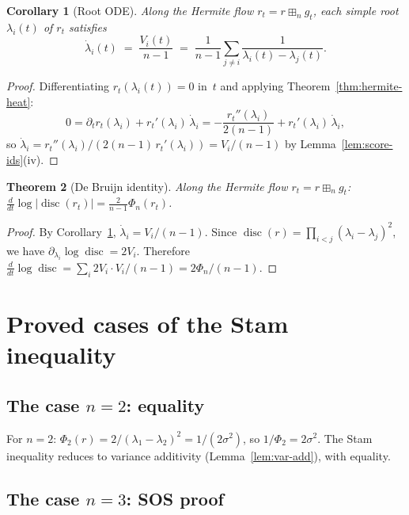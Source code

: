 \documentclass[10pt,a4paper]{amsart}
\theoremstyle{plain}
\newtheorem{theorem}{Theorem}[section]
\newtheorem{corollary}[theorem]{Corollary}
\theoremstyle{definition}
\theoremstyle{remark}
\newcommand{\fp}{\boxplus_n}
\DeclareMathOperator{\disc}{disc}
\begin{document}
\begin{corollary}[Root ODE]\label{cor:root-ode}
Along the Hermite flow $r_t=r\fp g_t$, each simple
root $\lambda_i(t)$ of $r_t$ satisfies
\begin{equation}\label{eq:root-ode}
  \dot\lambda_i(t)
  \;=\;\frac{V_i(t)}{n-1}
  \;=\;\frac{1}{n-1}\sum_{j\ne i}
  \frac{1}{\lambda_i(t)-\lambda_j(t)}.
\end{equation}
\end{corollary}

\begin{proof}
Differentiating $r_t(\lambda_i(t))=0$ in~$t$ and
applying Theorem~\ref{thm:hermite-heat}:
\[
  0=\partial_t r_t(\lambda_i)
  +r_t'(\lambda_i)\,\dot\lambda_i
  =-\frac{r_t''(\lambda_i)}{2(n-1)}
  +r_t'(\lambda_i)\,\dot\lambda_i,
\]
so $\dot\lambda_i
=r_t''(\lambda_i)/(2(n-1)\,r_t'(\lambda_i))
=V_i/(n-1)$
by Lemma~\ref{lem:score-ids}\textup{(iv)}.
\end{proof}

\begin{theorem}[De Bruijn identity]\label{thm:debruijn}
Along the Hermite flow $r_t=r\fp g_t$:
$\frac{d}{dt}\log|\disc(r_t)|
=\frac{2}{n-1}\Phi_n(r_t)$.
\end{theorem}

\begin{proof}
By Corollary~\ref{cor:root-ode},
$\dot\lambda_i=V_i/(n-1)$.
Since $\disc(r)=\prod_{i<j}(\lambda_i-\lambda_j)^2$,
we have $\partial_{\lambda_i}\log\disc=2V_i$.
Therefore
$\frac{d}{dt}\log\disc
=\sum_i 2V_i\cdot V_i/(n-1)
=2\Phi_n/(n-1)$.
\end{proof}


\section{Proved cases of the Stam inequality}
\label{sec:proved}

\subsection{The case \texorpdfstring{$n=2$}{n=2}: equality}
\label{ssec:n2}

For $n=2$: $\Phi_2(r)=2/(\lambda_1-\lambda_2)^2
=1/(2\sigma^2)$, so $1/\Phi_2=2\sigma^2$.
The Stam inequality reduces to variance additivity
(Lemma~\ref{lem:var-add}), with equality.

\subsection{The case \texorpdfstring{$n=3$}{n=3}: SOS proof}
\label{ssec:n3}
\end{document}
